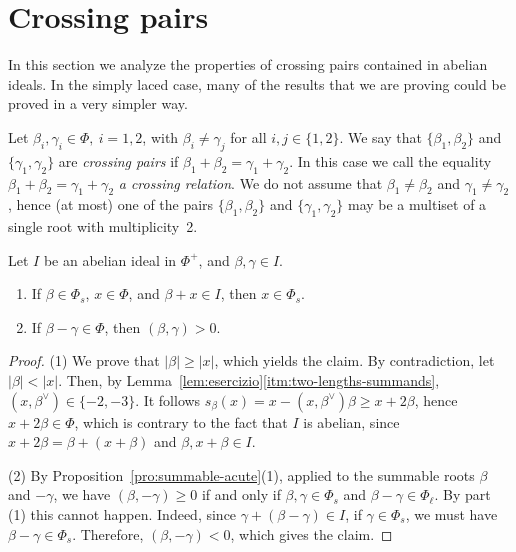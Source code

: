 \documentclass[ALCO,published]{cedram}
\theoremstyle{plain}
\newcommand\be{\beta}
\newcommand\ga{\gamma}
\begin{document}
\section{Crossing pairs}\label{sec:crossingpairs}

In this section we analyze the properties of crossing pairs contained in abelian ideals. 
In the simply laced case, many of the results that we are proving could be proved in a very simpler way.

\begin{defi}\label{def:crossing}
Let $\be_i, \ga_i\in \Phi, \ i=1, 2$, with $\be_i\neq \ga_j$ for all $i, j\in \{1, 2\}$. 
We say that 
$\{\be_1, \be_2\}$ and  $\{\ga_1, \ga_2\}$  are {\it crossing pairs} if $\be_1+\be_2=\ga_1+\ga_2$. 
In this case we call the equality $\be_1+\be_2=\ga_1+\ga_2$ {\it a crossing relation}. 
We do not assume that $\be_1\neq\be_2$ and $\ga_1\neq\ga_2$, hence (at most) one of the pairs $\{\be_1, \be_2\}$ and $\{\ga_1, \ga_2\}$ may be a multiset of a single root with multiplicity~2. 
\end{defi}

\begin{lem}\label{lem:corte-abeliani}
Let $I$ be an abelian ideal in $\Phi^+$, and $\be, \ga\in I$. 
\begin{enumerate} 
\item
If $\be\in \Phi_s$, $x\in \Phi$, and $\be+x\in I$, then $x\in \Phi_s$.
\label{itm:short-edge}
\item
If $\be-\ga\in\Phi$, then $(\be,\ga)> 0$.
\label{itm:non-ortogonali}
\end{enumerate}
\end{lem}

\begin{proof}
(1) We prove that $|\be|\geq |x|$, which yields the claim.
By contradiction, let $|\be|<|x|$. 
Then, by Lemma~\ref{lem:esercizio}\ref{itm:two-lengths-summands}, $(x, \be^\vee)\in \{-2, -3\}$. 
It follows $s_\be(x)=x -(x, \be^\vee)\be \geq x +2\be$, 
hence $x +2\be\in \Phi$, which is contrary to the fact that $I$ is abelian, since $x+2\be=\be+(x+\be)$ and $\be, x+\be\in I$.
\par
(2) By Proposition~\ref{pro:summable-acute}(1), applied to the summable roots $\be$ and $-\ga$, we have $(\be, -\ga)\geq 0$ if and only if $\be, \ga\in\Phi_s$ and $\be-\ga\in\Phi_\ell$. 
By part (1) this cannot happen. 
Indeed, since $\ga+(\be-\ga)\in I$, if $\ga\in \Phi_s$,   we must have $\be-\ga\in \Phi_s$.
Therefore,  $(\be, -\ga)<0$, which gives the claim.
\end{proof}
\end{document}
